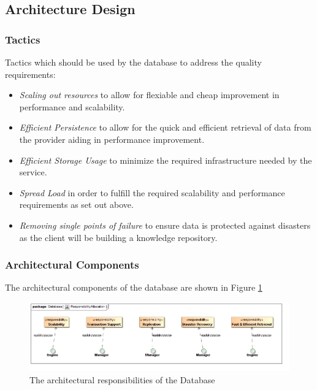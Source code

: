 \subsection{Architecture Design}
\subsubsection{Tactics}
Tactics which should be used by the database to address the quality requirements:
\begin{itemize}
	\item \textit{Scaling out resources} to allow for flexiable and cheap
		improvement in performance and scalability.
	\item \textit{Efficient Persistence} to allow for the quick and efficient
		retrieval of data from the provider aiding in performance
		improvement.
	\item \textit{Efficient Storage Usage} to minimize the required
	infrastructure needed by the service.
	\item \textit{Spread Load} in order to fulfill the required scalability
		and performance requirements as set out above.
	\item \textit{Removing single points of failure} to ensure data is
		protected against disasters as the client will be building a
		knowledge repository.
\end{itemize}

\subsubsection{Architectural Components}
The architectural components of the database are shown in 
Figure \ref{fig:databaseResponsibilityAllocation}
\begin{figure}[H]
	\begin{center}
	\includegraphics[scale=0.5]{../Diagrams and Charts/Database/ResponsibilityAllocation.jpg}
	\caption{The architectural responsibilities of the Database}
	\label{fig:databaseResponsibilityAllocation}
	\end{center}
\end{figure}

